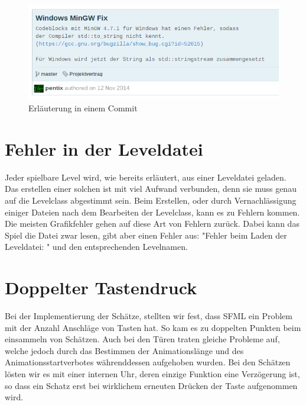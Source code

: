 \documentclass[11pt,a4paper]{scrbook}
\begin{document}
\begin{figure}[h]
\centering
\includegraphics[scale=0.8]{img/e419eef.png}
\caption{Erläuterung in einem Commit}
\end{figure}

\section{Fehler in der Leveldatei}
Jeder spielbare Level wird, wie bereits erläutert, aus einer Leveldatei geladen.
Das erstellen einer solchen ist mit viel Aufwand verbunden, denn sie muss genau auf die Levelclass abgestimmt sein.
Beim Erstellen, oder durch Vernachlässigung einiger Dateien nach dem Bearbeiten der Levelclass, kann es zu Fehlern kommen.
Die meisten Grafikfehler gehen auf diese Art von Fehlern zurück.
Dabei kann das Spiel die Datei zwar lesen, gibt aber einen Fehler aus: "Fehler beim Laden der Leveldatei: " und den entsprechenden Levelnamen.


\section{Doppelter Tastendruck}
Bei der Implementierung der Schätze, stellten wir fest, dass SFML ein Problem mit der Anzahl Anschläge von Tasten hat.
So kam es zu doppelten Punkten beim einsammeln von Schätzen.
Auch bei den Türen traten gleiche Probleme auf, welche jedoch durch das Bestimmen der Animationslänge und des Animationsstartverbotes währenddessen aufgehoben wurden.
Bei den Schätzen lösten wir es mit einer internen Uhr, deren einzige Funktion eine Verzögerung ist, so dass ein Schatz erst bei wirklichem erneuten Drücken der Taste aufgenommen wird.
\end{document}
